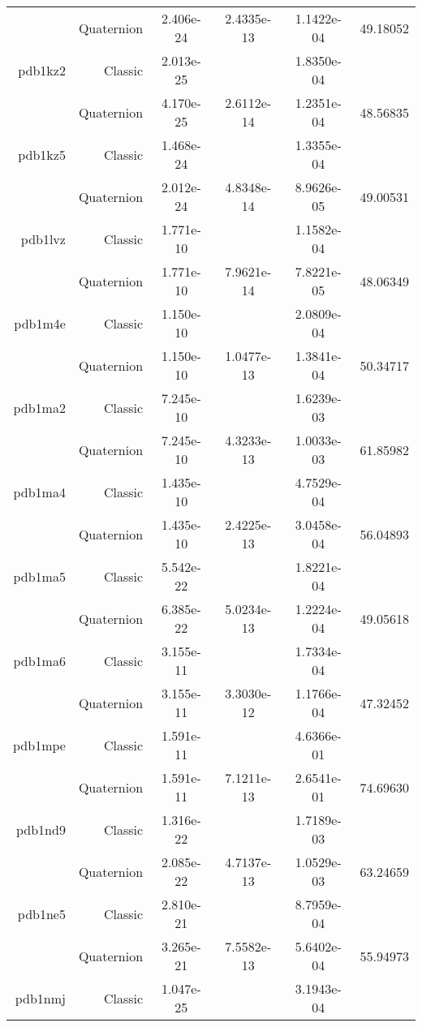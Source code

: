 \begin{xltabular}{\textwidth}{r|rS[table-format=1.3e+2]S[table-format=1.4e+2]S[table-format=1.4e+2]S[table-format=-1.5]}
& Quaternion & 2.406e-24 & 2.4335e-13 & 1.1422e-04 & 49.18052\\  \addlinespace
pdb1kz2 & Classic & 2.013e-25 &  & 1.8350e-04 & \\
& Quaternion & 4.170e-25 & 2.6112e-14 & 1.2351e-04 & 48.56835\\  \addlinespace
pdb1kz5 & Classic & 1.468e-24 &  & 1.3355e-04 & \\
& Quaternion & 2.012e-24 & 4.8348e-14 & 8.9626e-05 & 49.00531\\  \addlinespace
pdb1lvz & Classic & 1.771e-10 &  & 1.1582e-04 & \\
& Quaternion & 1.771e-10 & 7.9621e-14 & 7.8221e-05 & 48.06349\\  \addlinespace
pdb1m4e & Classic & 1.150e-10 &  & 2.0809e-04 & \\
& Quaternion & 1.150e-10 & 1.0477e-13 & 1.3841e-04 & 50.34717\\  \addlinespace
pdb1ma2 & Classic & 7.245e-10 &  & 1.6239e-03 & \\
& Quaternion & 7.245e-10 & 4.3233e-13 & 1.0033e-03 & 61.85982\\  \addlinespace
pdb1ma4 & Classic & 1.435e-10 &  & 4.7529e-04 & \\
& Quaternion & 1.435e-10 & 2.4225e-13 & 3.0458e-04 & 56.04893\\  \addlinespace
pdb1ma5 & Classic & 5.542e-22 &  & 1.8221e-04 & \\
& Quaternion & 6.385e-22 & 5.0234e-13 & 1.2224e-04 & 49.05618\\  \addlinespace
pdb1ma6 & Classic & 3.155e-11 &  & 1.7334e-04 & \\
& Quaternion & 3.155e-11 & 3.3030e-12 & 1.1766e-04 & 47.32452\\  \addlinespace
pdb1mpe & Classic & 1.591e-11 &  & 4.6366e-01 & \\
& Quaternion & 1.591e-11 & 7.1211e-13 & 2.6541e-01 & 74.69630\\  \addlinespace
pdb1nd9 & Classic & 1.316e-22 &  & 1.7189e-03 & \\
& Quaternion & 2.085e-22 & 4.7137e-13 & 1.0529e-03 & 63.24659\\  \addlinespace
pdb1ne5 & Classic & 2.810e-21 &  & 8.7959e-04 & \\
& Quaternion & 3.265e-21 & 7.5582e-13 & 5.6402e-04 & 55.94973\\  \addlinespace
pdb1nmj & Classic & 1.047e-25 &  & 3.1943e-04 & \\

\end{xltabular}

